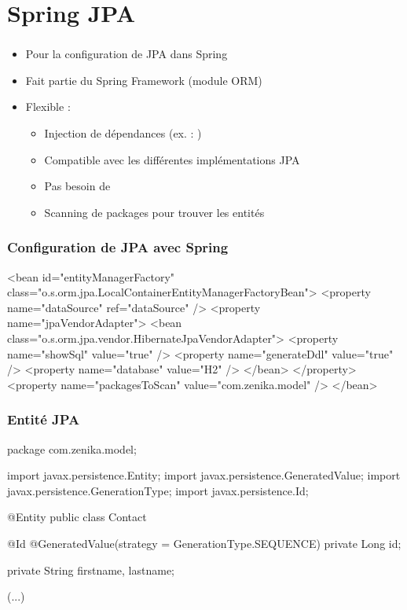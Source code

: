 \section{Spring JPA}



\begin{frame}
 \frametitle{}
 \begin{itemize}
  \item Pour la configuration de JPA dans Spring
  \item Fait partie du Spring Framework (module ORM)
  \item Flexible :
  \begin{itemize}  
    \item Injection de dépendances (ex. : )
    \item Compatible avec les différentes implémentations JPA
    \item Pas besoin de 
    \item Scanning de packages pour trouver les entités
  \end{itemize}
 \end{itemize}

\end{frame}


\begin{frame}[fragile]
 \frametitle{Configuration de JPA avec Spring}

 \begin{xmlcode}
<bean id="entityManagerFactory"
      class="o.s.orm.jpa.LocalContainerEntityManagerFactoryBean">
  <property name="dataSource" ref="dataSource" />
  <property name="jpaVendorAdapter">
    <bean class="o.s.orm.jpa.vendor.HibernateJpaVendorAdapter">
      <property name="showSql" value="true" />
      <property name="generateDdl" value="true" />
      <property name="database" value="H2" />
    </bean>
  </property>
  <property name="packagesToScan" value="com.zenika.model" />
</bean>
 \end{xmlcode}
\end{frame}

\begin{frame}[fragile]
 \frametitle{Entité JPA}

 \begin{javacode}
package com.zenika.model;

import javax.persistence.Entity;
import javax.persistence.GeneratedValue;
import javax.persistence.GenerationType;
import javax.persistence.Id;

@Entity
public class Contact {

  @Id
  @GeneratedValue(strategy = GenerationType.SEQUENCE)
  private Long id;

  private String firstname, lastname;
  
  (...)
}
 \end{javacode}
\end{frame}

